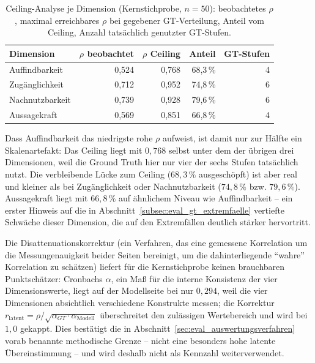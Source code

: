 \begin{table}[H]
    \centering
    \scriptsize
    \renewcommand{\arraystretch}{1.2}
    \begin{tabular}{lrrrr}
    \hline
    \textbf{Dimension} & \textbf{$\rho$ beobachtet} & \textbf{$\rho$ Ceiling} & \textbf{Anteil} & \textbf{GT-Stufen} \\
    \hline
    Auffindbarkeit & 0,524 & 0,768 & 68,3\,\% & 4 \\
    Zugänglichkeit & 0,712 & 0,952 & 74,8\,\% & 6 \\
    Nachnutzbarkeit & 0,739 & 0,928 & 79,6\,\% & 6 \\
    Aussagekraft & 0,569 & 0,851 & 66,8\,\% & 4 \\
    \hline
    \end{tabular}
    \captionsetup{justification=centering}
    \caption[Ceiling-Analyse der Kernstichprobe]{Ceiling-Analyse je Dimension (Kernstichprobe, $n=50$): beobachtetes $\rho$, maximal erreichbares $\rho$ bei gegebener GT-Verteilung, Anteil vom Ceiling, Anzahl tatsächlich genutzter GT-Stufen.}
    \label{tab:gt_kern_ceiling}
\end{table}

Dass Auffindbarkeit das niedrigste rohe $\rho$ aufweist, ist damit nur zur Hälfte
ein Skalenartefakt: Das Ceiling liegt mit $0{,}768$ selbst unter dem der übrigen drei
Dimensionen, weil die Ground Truth hier nur vier der sechs Stufen tatsächlich
nutzt. Die verbleibende Lücke zum Ceiling ($68{,}3\,\%$ ausgeschöpft) ist aber real
und kleiner als bei Zugänglichkeit oder Nachnutzbarkeit ($74{,}8\,\%$ bzw.
$79{,}6\,\%$). Aussagekraft liegt mit $66{,}8\,\%$ auf ähnlichem Niveau wie
Auffindbarkeit -- ein erster Hinweis auf die in Abschnitt~\ref{subsec:eval_gt_extremfaelle} vertiefte Schwäche
dieser Dimension, die auf den Extremfällen deutlich stärker hervortritt.

Die Disattenuationskorrektur (ein Verfahren, das eine gemessene Korrelation um die
Messungenauigkeit beider Seiten bereinigt, um die dahinterliegende ``wahre''
Korrelation zu schätzen) liefert für die Kernstichprobe keinen brauchbaren
Punktschätzer: Cronbachs $\alpha$, ein Maß für die interne Konsistenz der vier
Dimensionswerte, liegt auf der Modellseite bei nur $0{,}294$, weil die vier Dimensionen
absichtlich verschiedene Konstrukte messen; die Korrektur
$r_{\text{latent}} = \rho / \sqrt{\alpha_{GT} \cdot \alpha_{\text{Modell}}}$
überschreitet den zulässigen Wertebereich und wird bei $1{,}0$ gekappt. Dies
bestätigt die in Abschnitt~\ref{sec:eval_auswertungsverfahren} vorab benannte methodische Grenze -- nicht eine
besonders hohe latente Übereinstimmung -- und wird deshalb nicht als Kennzahl
weiterverwendet.

